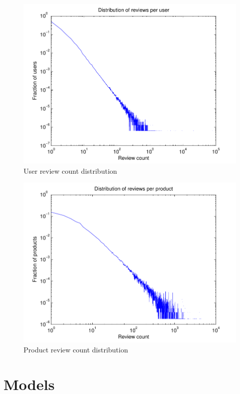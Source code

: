 \documentclass[letterpaper, 10 pt, conference]{ieeeconf}
\begin{document}
\begin{figure}[h]
\includegraphics[scale=0.6]{images/user_hist.pdf}
\caption{User review count distribution}
\label{fig:userhist}
\end{figure}

\begin{figure}[h]
\includegraphics[scale=0.6]{images/product_hist.pdf}
\caption{Product review count distribution}
\label{fig:producthist}
\end{figure}

\section{Models}
\label{sec:models}
\end{document}
